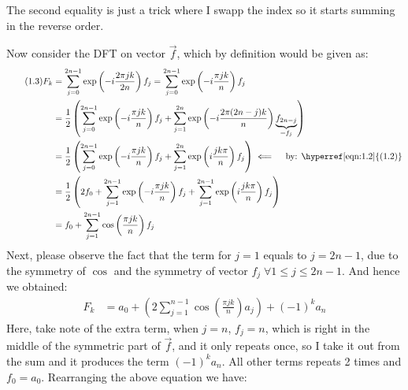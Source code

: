 \documentclass[]{article}
\begin{document}
    The second equality is just a trick where I swapp the index so it starts summing in the reverse order. 
    \par
    Now consider the DFT on vector $\vec{f}$, which by definition would be given as: 
    \begin{align*}\tag{1.3}\label{eqn:1.3}
        F_k &= \sum_{j = 0}^{2n - 1}
            \exp\left(
                - i \frac{2\pi j k}{2n}
            \right)f_j
        = \sum_{j = 0}^{2n - 1}
        \exp\left(
            - i \frac{\pi j k}{n}
        \right)f_j
        \\
        &= 
        \frac{1}{2}
        \left(
            \sum_{j = 0}^{2n - 1}
            \exp
            \left(
                -i\frac{\pi j k}{n}
            \right)f_j
            + 
            \sum_{j = 1}^{2n}
            \exp\left(
                -i \frac{2\pi (2n - j)k}{n}
            \right)\underbrace{f_{2n -j}}_{= f_j}
        \right)
        \\
        &= 
        \frac{1}{2}
        \left(
            \sum_{j = 0}^{2n - 1}
            \exp
            \left(
                -i\frac{\pi j k}{n}
            \right)f_j
            + 
            \sum_{j = 1}^{2n}
            \exp\left(
                i\frac{jk\pi}{n}
            \right)f_j
        \right) \impliedby \quad \text{by: \hyperref[eqn:1.2]{(1.2)}}
        \\
        &= \frac{1}{2}
        \left(
            2f_0 + 
            \sum_{j = 1}^{2n - 1}
            \exp
            \left(
                -i\frac{\pi j k}{n}
            \right)f_j
            + 
            \sum_{j = 1}^{2n - 1}
            \exp\left(
                i\frac{jk\pi}{n}
            \right)f_j
        \right)
        \\
        &= f_0 + \sum_{j = 1}^{2n - 1}
        \cos\left(
            \frac{\pi j k}{n}
        \right)f_j
    \end{align*}
    Next, please observe the fact that the term for $j = 1$ equals to $j = 2n - 1$, due to the symmetry of $\cos$ and the symmetry of vector $f_j\; \forall 1 \le j \le 2n - 1$. And hence we obtained: 
    \begin{align*}\tag{1.4}\label{eqn:1.4}
        F_k &= a_0 + \left(
            2 \sum_{j = 1}^{n - 1}
            \cos\left(
                \frac{\pi j k}{n}
            \right)a_j
        \right) + (-1)^k a_n
    \end{align*}    
    Here, take note of the extra term, when $j = n$, $f_j = n$, which is right in the middle of the symmetric part of $\vec{f}$, and it only repeats once, so I take it out from the sum and it produces the term $(- 1)^ka_n$. All other terms repeats 2 times and $f_0 = a_0$. Rearranging the above equation we have: 
\end{document}

